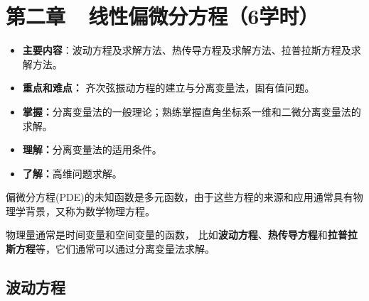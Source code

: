 \renewcommand{\thechapter}{}
\chapter{第二章~~线性偏微分方程（6学时）} 
\renewcommand{\thechapter}{2}
\begin{itemize}
\item \textbf{主要内容}：波动方程及求解方法、热传导方程及求解方法、拉普拉斯方程及求解方法。
\item \textbf{重点和难点：} 齐次弦振动方程的建立与分离变量法，固有值问题。
\item \textbf{掌握：}分离变量法的一般理论；熟练掌握直角坐标系一维和二微分离变量法的求解。
\item \textbf{理解：}分离变量法的适用条件。
\item \textbf{了解：}高维问题求解。
\end{itemize}

\begin{definition}[] 偏微分方程(PDE)的未知函数是多元函数，由于这些方程的来源和应用通常具有物理学背景，又称为数学物理方程。
\end{definition}	物理量通常是时间变量和空间变量的函数， 比如\textbf{波动方程}、\textbf{热传导方程}和\textbf{拉普拉斯方程}等，它们通常可以通过分离变量法求解。

\section{波动方程}

